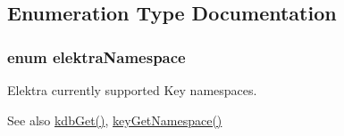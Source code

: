 \subsection{Enumeration Type Documentation}
\hypertarget{group__key_gaec3b8d6f430ae49b91bafe8a86310a68}{
\subsubsection[{elektra\+Namespace}]{\setlength{\rightskip}{0pt plus 5cm}enum {\bf elektra\+Namespace}}}\label{group__key_gaec3b8d6f430ae49b91bafe8a86310a68}


Elektra currently supported Key namespaces. 

\begin{DoxySeeAlso}{See also}
\hyperlink{group__kdb_ga28e385fd9cb7ccfe0b2f1ed2f62453a1}{kdb\+Get()}, \hyperlink{group__keyname_gafc3ca03ed10f87eb59bdc02cf2a0de8d}{key\+Get\+Namespace()} 
\end{DoxySeeAlso}
